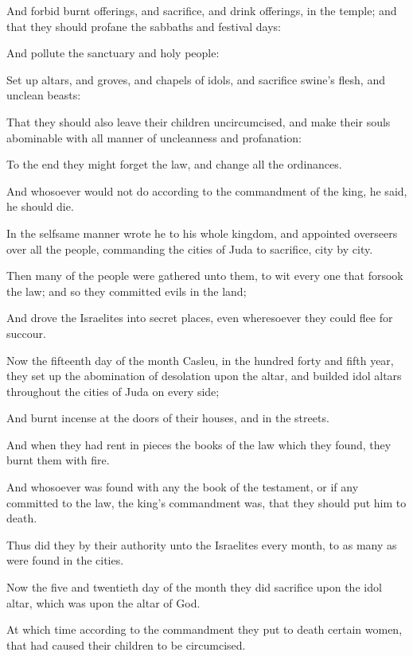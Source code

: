 {\par }{\PP {}And forbid burnt offerings, and sacrifice, and drink offerings, in the temple; and that they should profane the sabbaths and festival days:
\par }{\PP {}And pollute the sanctuary and holy people:
\par }{\PP {}Set up altars, and groves, and chapels of idols, and sacrifice swine’s flesh, and unclean beasts:
\par }{\PP {}That they should also leave their children uncircumcised, and make their souls abominable with all manner of uncleanness and profanation:
\par }{\PP {}To the end they might forget the law, and change all the ordinances.
\par }{\PP {}And whosoever would not do according to the commandment of the king, he said, he should die.
\par }{\PP {}In the selfsame manner wrote he to his whole kingdom, and appointed overseers over all the people, commanding the cities of Juda to sacrifice, city by city.
\par }{\PP {}Then many of the people were gathered unto them, to wit every one that forsook the law; and so they committed evils in the land;
\par }{\PP {}And drove the Israelites into secret places, even wheresoever they could flee for succour.
\par }{\PP {}Now the fifteenth day of the month Casleu, in the hundred forty and fifth year, they set up the abomination of desolation upon the altar, and builded idol altars throughout the cities of Juda on every side;
\par }{\PP {}And burnt incense at the doors of their houses, and in the streets.
\par }{\PP {}And when they had rent in pieces the books of the law which they found, they burnt them with fire.
\par }{\PP {}And whosoever was found with any the book of the testament, or if any committed to the law, the king’s commandment was, that they should put him to death.
\par }{\PP {}Thus did they by their authority unto the Israelites every month, to as many as were found in the cities.
\par }{\PP {}Now the five and twentieth day of the month they did sacrifice upon the idol altar, which was upon the altar of God.
\par }{\PP {}At which time according to the commandment they put to death certain women, that had caused their children to be circumcised.
}
